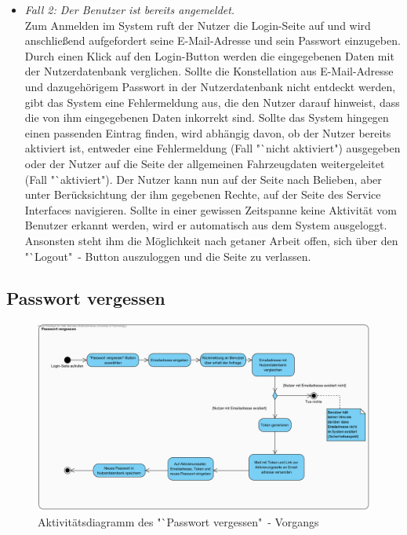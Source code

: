 \documentclass[fontsize = 12pt, paper = a4]{scrreprt}
\begin{document}
\begin{itemize}

\item \textit{Fall 2: Der Benutzer ist bereits angemeldet.} \\ 
Zum Anmelden im System ruft der Nutzer die Login-Seite auf und wird anschließend aufgefordert seine E-Mail-Adresse und sein Passwort einzugeben. Durch einen Klick auf den Login-Button werden die eingegebenen Daten mit der Nutzerdatenbank verglichen. Sollte die Konstellation aus E-Mail-Adresse und dazugehörigem Passwort in der Nutzerdatenbank nicht entdeckt werden, gibt das System eine Fehlermeldung aus, die den Nutzer darauf hinweist, dass die von ihm eingegebenen Daten inkorrekt sind. Sollte das System hingegen einen passenden Eintrag finden, wird abhängig davon, ob der Nutzer bereits aktiviert ist, entweder eine Fehlermeldung (Fall "`nicht aktiviert") ausgegeben oder der Nutzer auf die Seite der allgemeinen Fahrzeugdaten weitergeleitet (Fall "`aktiviert"). Der Nutzer kann nun auf der Seite nach Belieben, aber unter Berücksichtung der ihm gegebenen Rechte, auf der Seite des Service Interfaces navigieren.
Sollte in einer gewissen Zeitspanne keine Aktivität vom Benutzer erkannt werden, wird er automatisch aus dem System ausgeloggt.
Ansonsten steht ihm die Möglichkeit nach getaner Arbeit offen, sich über den "`Logout"\ - Button auszuloggen und die Seite zu verlassen.

\end{itemize}

\newpage

\subsection{Passwort vergessen}

\begin{figure}
\centering
\includegraphics[scale = 0.6]{passwort_vergessen_vorgang}
\caption[Aktivitätsdiagramm Passwort vergessen - Vorgang] {Aktivitätsdiagramm des "`Passwort vergessen"\ - Vorgangs}
\end{figure} 
\end{document}
